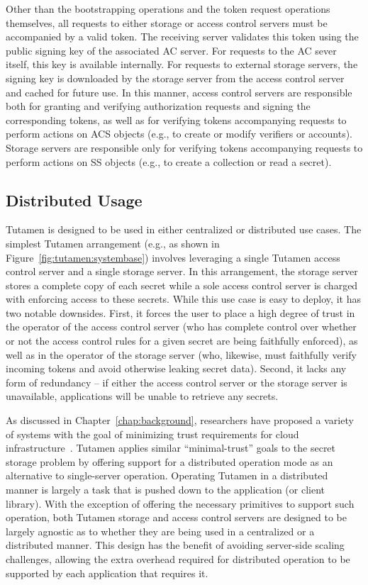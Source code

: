 Other than the bootstrapping operations and the token request
operations themselves, all requests to either storage or access
control servers must be accompanied by a valid token. The receiving
server validates this token using the public signing key of the
associated AC server. For requests to the AC sever itself, this key is
available internally. For requests to external storage servers, the
signing key is downloaded by the storage server from the access
control server and cached for future use. In this manner, access
control servers are responsible both for granting and verifying
authorization requests and signing the corresponding tokens, as well
as for verifying tokens accompanying requests to perform actions on
ACS objects (e.g., to create or modify verifiers or accounts). Storage
servers are responsible only for verifying tokens accompanying
requests to perform actions on SS objects (e.g., to create a
collection or read a secret).

\subsection{Distributed Usage}
\label{chap:tutamen:arch:distributed}

Tutamen is designed to be used in either centralized or distributed
use cases. The simplest Tutamen arrangement (e.g., as shown in
Figure~\ref{fig:tutamen:systembase}) involves leveraging a single
Tutamen access control server and a single storage server. In this
arrangement, the storage server stores a complete copy of each secret
while a sole access control server is charged with enforcing access to
these secrets. While this use case is easy to deploy, it has two
notable downsides. First, it forces the user to place a high degree of
trust in the operator of the access control server (who has complete
control over whether or not the access control rules for a given
secret are being faithfully enforced), as well as in the operator of
the storage server (who, likewise, must faithfully verify incoming
tokens and avoid otherwise leaking secret data). Second, it lacks any
form of redundancy -- if either the access control server or the
storage server is unavailable, applications will be unable to retrieve
any secrets.

As discussed in Chapter~\ref{chap:background}, researchers have
proposed a variety of systems with the goal of minimizing trust
requirements for cloud infrastructure~\cite{bessani2011,
  kallahalla2003, kubiatowicz2000, mahajan2011,
  wilcox-o'hearn2008}. Tutamen applies similar ``minimal-trust'' goals
to the secret storage problem by offering support for a distributed
operation mode as an alternative to single-server operation. Operating
Tutamen in a distributed manner is largely a task that is pushed down
to the application (or client library). With the exception of offering
the necessary primitives to support such operation, both Tutamen
storage and access control servers are designed to be largely agnostic
as to whether they are being used in a centralized or a distributed
manner. This design has the benefit of avoiding server-side scaling
challenges, allowing the extra overhead required for distributed
operation to be supported by each application that requires it.


